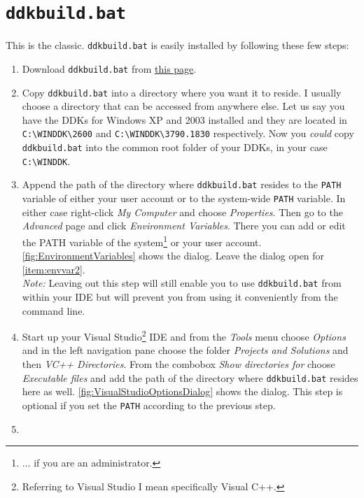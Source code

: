 \documentclass[a4paper,titlepage]{report}
\newcommand{\linkclr}[1]{\textcolor[rgb]{0.00,0.00,0.60}{#1}}
\newcommand{\extlink}[2]{\href{#1}{\linkclr{#2}}}
\begin{document}
\section{\texttt{ddkbuild.bat}}
\label{sec:batchversion}
This is the classic. \texttt{ddkbuild.bat} is easily installed by following these
few steps:
\begin{enumerate}
  \item
    Download \texttt{ddkbuild.bat} from \extlink{http://www.osronline.com/article.cfm?article=43}{this page}.
  \item
    Copy \texttt{ddkbuild.bat} into a directory where you want it to reside. I usually
    choose a directory that can be accessed from anywhere else. Let us say you have
    the DDKs for Windows XP and 2003 installed and they are located in \verb+C:\WINDDK\2600+
    and \verb+C:\WINDDK\3790.1830+ respectively. Now you \emph{could} copy \texttt{ddkbuild.bat}
    into the common root folder of your DDKs, in your case \verb+C:\WINDDK+.
  \item \label{item:envvar1}
    Append the path of the directory where \texttt{ddkbuild.bat} resides to the \texttt{PATH}
    variable of either your user account or to the system-wide \texttt{PATH} variable. In
    either case right-click \emph{My Computer} and choose \emph{Properties}. Then go to the
    \emph{Advanced} page and click \emph{Environment Variables}. There you can add or edit
    the PATH variable of the system\footnote{... if you are an administrator.} or your user
    account.
    \autoref{fig:EnvironmentVariables} shows the dialog. Leave the dialog open for
    \autoref{item:envvar2}.\\
    \emph{Note:} Leaving out this step will still enable you to use \texttt{ddkbuild.bat} from
    within your IDE but will prevent you from using it conveniently from the command line.
  \item
    Start up your Visual Studio\footnote{Referring to Visual Studio I mean specifically
    Visual C++.} IDE and from the \emph{Tools} menu choose \emph{Options} and in the left
    navigation pane choose the folder \emph{Projects and Solutions} and then \emph{VC++ Directories}.
    From the combobox \emph{Show directories for} choose \emph{Executable files} and add the
    path of the directory where \texttt{ddkbuild.bat} resides here as well.
    \autoref{fig:VisualStudioOptionsDialog} shows the dialog. This step is optional if you
    set the \texttt{PATH} according to the previous step.
  \item \label{item:envvar2}

\end{enumerate}
\end{document}
